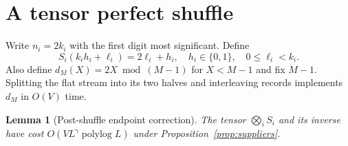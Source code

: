 \documentclass[11pt]{article}
\newtheorem{lemma}[theorem]{Lemma}
\newcommand{\polylog}{\operatorname{polylog}}
\begin{document}
\section{A tensor perfect shuffle}

Write $n_i=2k_i$ with the first digit most significant. Define
\[
 S_i(k_i h_i+\ell_i)=2\ell_i+h_i,
 \quad h_i\in\{0,1\},\quad 0\le\ell_i<k_i.
\]
Also define $d_M(X)=2X\bmod(M-1)$ for $X<M-1$ and fix $M-1$.
Splitting the flat stream into its two halves and interleaving records
implements $d_M$ in $O(V)$ time.

\begin{lemma}[Post-shuffle endpoint correction]
\label{lem:shuffle}
The tensor $\bigotimes_i S_i$ and its inverse have cost
$O(VL^\gamma\polylog L)$ under Proposition~\ref{prop:suppliers}.
\end{lemma}
\end{document}
